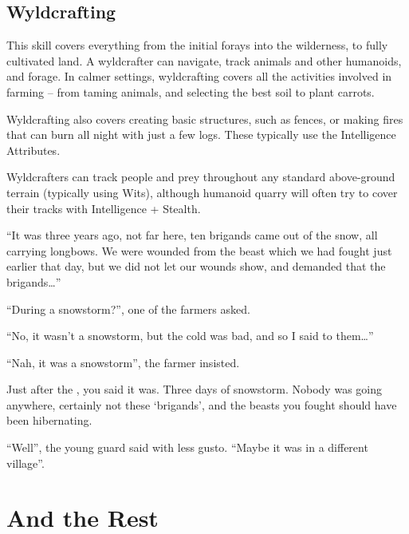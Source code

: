 \begin{multicols}{2}
\subsection{Wyldcrafting}

This skill covers everything from the initial forays into the wilderness, to fully cultivated land.
A wyldcrafter can navigate, track animals and other humanoids, and forage.
In calmer settings, wyldcrafting covers all the activities involved in farming -- from taming animals, and selecting the best soil to plant carrots.

Wyldcrafting also covers creating basic structures, such as fences, or making fires that can burn all night with just a few logs.
These typically use the Intelligence Attributes.

Wyldcrafters can track people and prey throughout any standard above-ground terrain (typically using Wits), although humanoid quarry will often try to cover their tracks with Intelligence + Stealth.

\begin{exampletext}
  ``It was three years ago, not far here, ten brigands came out of the snow, all carrying longbows.
  We were wounded from the beast which we had fought just earlier that day, but we did not let our wounds show, and demanded that the brigands\ldots''

  ``During a snowstorm?'', one of the farmers asked.

  ``No, it wasn't a snowstorm, but the cold was bad, and so I said to them\ldots''

  ``Nah, it was a snowstorm'', the farmer insisted.

  Just after the \iftoggle{aif}{eclipse of \gls{ainumar}}{blue moon}, you said it was.
  Three days of snowstorm.
  Nobody was going anywhere, certainly not these `brigands', and the beasts you fought should have been hibernating.

  ``Well'', the young guard said with less gusto.
  ``Maybe it was in a different village''.

\end{exampletext}

\end{multicols}

\section{And the Rest}

